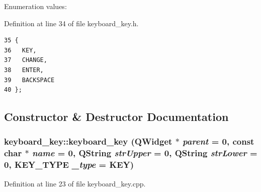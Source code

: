 \begin{Desc}
\item[Enumeration values: ]\par
\begin{description}
\item[{\em 
KEY\label{classkeyboard__key_keyboard__keyw4keyboard__keyw0}
}]\item[{\em 
CHANGE\label{classkeyboard__key_keyboard__keyw4keyboard__keyw1}
}]\item[{\em 
ENTER\label{classkeyboard__key_keyboard__keyw4keyboard__keyw2}
}]\item[{\em 
BACKSPACE\label{classkeyboard__key_keyboard__keyw4keyboard__keyw3}
}]\end{description}
\end{Desc}



Definition at line 34 of file keyboard\_\-key.h.



\footnotesize\begin{verbatim}35 {
36   KEY,
37   CHANGE,
38   ENTER,
39   BACKSPACE
40 };
\end{verbatim}\normalsize 


\subsection{Constructor \& Destructor Documentation}
\subsubsection{\setlength{\rightskip}{0pt plus 5cm}keyboard\_\-key::keyboard\_\-key ({\bf QWidget} $\ast$ {\em parent} = 0, const char $\ast$ {\em name} = 0, QString {\em str\-Upper} = 0, QString {\em str\-Lower} = 0, {\bf KEY\_\-TYPE} {\em \_\-type} = KEY)}\label{classkeyboard__key_keyboard__keya0}




Definition at line 23 of file keyboard\_\-key.cpp.

